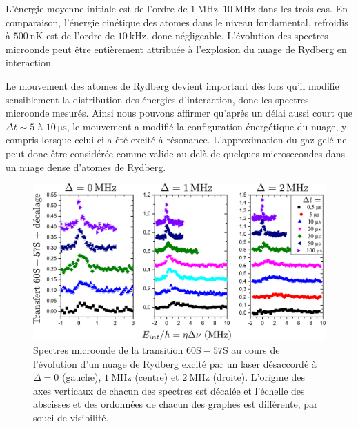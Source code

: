 L'énergie moyenne initiale est de l'ordre de $\SIrange{1}{10}{\MHz}$ dans les trois cas.
En comparaison, l'énergie cinétique des atomes dans le niveau fondamental, refroidis à $\SI{500}{\nano\K}$ est de l'ordre de $\SI{10}{\kHz}$, donc négligeable.
L'évolution des spectres microonde peut être entièrement attribuée à l'explosion du nuage de Rydberg en interaction.

Le mouvement des atomes de Rydberg devient important dès lors qu'il modifie sensiblement la distribution des énergies d'interaction, donc les spectres microonde mesurés.
Ainsi nous pouvons affirmer qu'après un délai aussi court que $\Delta t \sim \num{5}$ à $\SI{10}{\us}$, le mouvement a modifié la configuration énergétique du nuage, y compris lorsque celui-ci a été excité à résonance.
L'approximation du \og gaz gelé \fg{} ne peut donc être considérée comme valide au delà de quelques microsecondes dans un nuage dense d'atomes de Rydberg.

\clearpage

\begin{figure}[t]
\centering
\includegraphics[width=\linewidth]{figures/low_l/expansion_012MHz}
\caption[Spectroscopie microonde de l'expansion du nuage]{
Spectres microonde de la transition $\mathrm{60S-57S}$ au cours de l'évolution d'un nuage de Rydberg excité par un laser désaccordé à $\Delta= 0$ (gauche), $\SI{1}{\MHz}$ (centre) et $\SI{2}{\MHz}$ (droite).
L'origine des axes verticaux de chacun des spectres est décalée et l'échelle des abscisses et des ordonnées de chacun des graphes est différente, par souci de visibilité.
}
\label{fig:microwave_explosion}
\end{figure}


